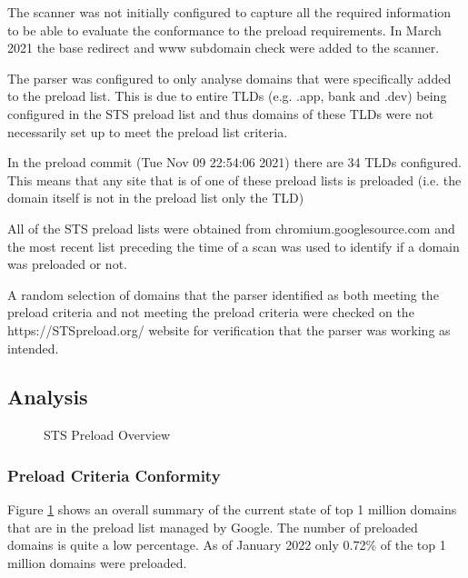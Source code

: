 \documentclass{mscreport}
\begin{document}
\noindent
The scanner was not initially configured to capture all the required information to be able to evaluate the conformance to the preload requirements. In March 2021 the base redirect and www subdomain check were added to the scanner.

\vspace{0.3cm} \noindent
The parser was configured to only analyse domains that were specifically added to the preload list. This is due to entire TLDs (e.g. .app, bank and .dev) being configured in the STS preload list and thus domains of these TLDs were not necessarily set up to meet the preload list criteria.

\vspace{0.3cm} \noindent
In the preload commit (Tue Nov 09 22:54:06 2021) there are 34 TLDs configured. This means that any site that is of one of these preload lists is preloaded (i.e. the domain itself is not in the preload list only the TLD)

\vspace{0.3cm} \noindent
All of the STS preload lists were obtained from chromium.googlesource.com and the most recent list preceding the time of a scan was used to identify if a domain was preloaded or not.

\vspace{0.3cm} \noindent
A random selection of domains that the parser identified as both meeting the preload criteria and not meeting the preload criteria were checked on the https://STSpreload.org/ website for verification that the parser was working as intended.


\clearpage
\newpage


\subsection{Analysis}

\begin{figure}[t]
	\begin{center}
		\caption{STS Preload Overview}
		\label{fig:STS_preloaded_overview}
	\end{center}
\end{figure}

\subsubsection{Preload Criteria Conformity}

\noindent
Figure \ref{fig:STS_preloaded_overview} shows an overall summary of the current state of top 1 million domains that are in the preload list managed by Google. The number of preloaded domains is quite a low percentage. As of January 2022 only 0.72\% of the top 1 million domains were preloaded.
\end{document}
